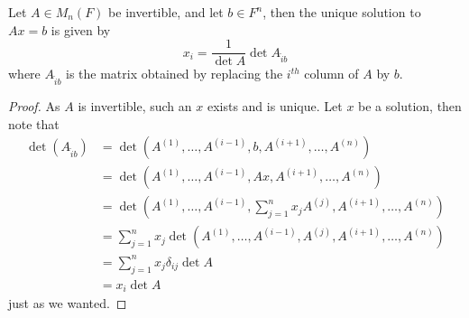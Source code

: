 \begin{proposition}
    Let $A\in M_n(F)$ be invertible, and let $b\in F^n$, then the unique solution to $Ax=b$ is given by
    $$x_i=\frac{1}{\det A}\det A_{\hat{i}b}$$
    where $A_{\hat{i}b}$ is the matrix obtained by replacing the $i^{th}$ column of $A$ by $b$.
\end{proposition}
\begin{proof}
    As $A$ is invertible, such an $x$ exists and is unique.
    Let $x$ be a solution, then note that
    \begin{align*}
        \det(A_{\hat{i}b})&=\det(A^{(1)},\ldots,A^{(i-1)},b,A^{(i+1)},\ldots,A^{(n)})\\
        &=\det(A^{(1)},\ldots,A^{(i-1)},Ax,A^{(i+1)},\ldots,A^{(n)})\\
        &=\det\left(A^{(1)},\ldots,A^{(i-1)},\sum_{j=1}^nx_jA^{(j)},A^{(i+1)},\ldots,A^{(n)}\right)\\
        &=\sum_{j=1}^nx_j\det(A^{(1)},\ldots,A^{(i-1)},A^{(j)},A^{(i+1)},\ldots,A^{(n)})\\
        &=\sum_{j=1}^nx_j\delta_{ij}\det A\\
        &=x_i\det A
    \end{align*}
    just as we wanted.
\end{proof}